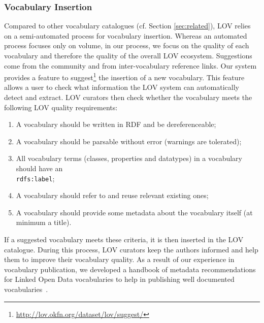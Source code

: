 \documentclass{iosart2c}
\begin{document}

	\subsubsection{Vocabulary Insertion}\label{sssec:vocabInsert} Compared to other vocabulary catalogues (cf. Section \ref{sec:related}), LOV relies on a semi-automated process for vocabulary insertion. Whereas an automated process focuses only on volume, in our process, we focus on the quality of each vocabulary and therefore the quality of the overall LOV ecosystem. Suggestions come from the community and from inter-vocabulary reference links. Our system provides a feature to suggest\footnote{\url{http://lov.okfn.org/dataset/lov/suggest/}} the insertion of a new vocabulary. This feature allows a user to check what information the LOV system can automatically detect and extract. LOV curators then check whether the vocabulary meets the following LOV quality requirements:
\begin{enumerate}
 \item A vocabulary should be written in RDF and be dereferenceable;
 \item A vocabulary should be parsable without error (warnings are tolerated);
 \item All vocabulary terms (classes, properties and datatypes) in a vocabulary should have an \\ {\small\texttt{rdfs:label}};
 \item A vocabulary should refer to and reuse relevant existing ones;
 \item A vocabulary should provide some metadata about the vocabulary itself (at minimum a title).
\end{enumerate}
If a suggested vocabulary meets these criteria, it is then inserted in the LOV catalogue. During this process, LOV curators keep the authors informed and help them to improve their vocabulary quality. As a result of our experience in vocabulary publication, we developed a handbook of metadata recommendations for Linked Open Data vocabularies to help in publishing well documented vocabularies~\cite{vandenbussche2011metadata}.
\end{document}
